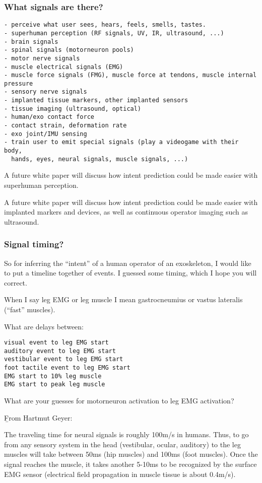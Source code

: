 \documentclass[letterpaper,12pt,fullpage]{article}
\begin{document}
\subsubsection{What signals are there?}

\begin{verbatim}
- perceive what user sees, hears, feels, smells, tastes.
- superhuman perception (RF signals, UV, IR, ultrasound, ...)
- brain signals
- spinal signals (motorneuron pools)
- motor nerve signals
- muscle electrical signals (EMG)
- muscle force signals (FMG), muscle force at tendons, muscle internal pressure
- sensory nerve signals
- implanted tissue markers, other implanted sensors
- tissue imaging (ultrasound, optical)
- human/exo contact force
- contact strain, deformation rate
- exo joint/IMU sensing
- train user to emit special signals (play a videogame with their body,
  hands, eyes, neural signals, muscle signals, ...)
\end{verbatim}

A future white paper will discuss how intent prediction could be 
made easier with superhuman perception.

A future white paper will discuss how intent prediction could be 
made easier with implanted markers and devices, as well as continuous
operator imaging such as ultrasound.

\subsubsection{Signal timing?}

So for inferring the ``intent'' of a human operator of an
exoskeleton,
I would like to put a timeline together of events.
I guessed some timing, which I hope you will correct.

When I say leg EMG or leg muscle I mean
gastrocneumius or vastus lateralis (``fast'' muscles).

What are delays between:
\begin{verbatim}
visual event to leg EMG start
auditory event to leg EMG start
vestibular event to leg EMG start
foot tactile event to leg EMG start
EMG start to 10% leg muscle
EMG start to peak leg muscle
\end{verbatim}

What are your guesses for motorneuron activation to leg EMG activation?

{\b From Hartmut Geyer:}

The traveling time for neural signals is roughly 100m/s in humans.
Thus, to go from any sensory system in the head (vestibular, ocular,
auditory) to the leg muscles will take between 50ms (hip muscles) and
100ms (foot muscles). Once the signal reaches the muscle, it takes
another 5-10ms to be recognized by the surface EMG sensor (electrical
field propagation in muscle tissue is about 0.4m/s).
\end{document}

